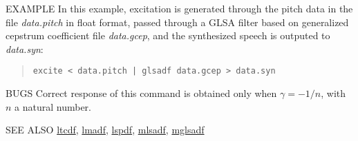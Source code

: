 \newpage
\begin{options}
\end{options}

\begin{qsection}{EXAMPLE}
In this example, excitation is generated through the pitch data
in the file {\em data.pitch} in float format, passed through a
GLSA filter based on generalized cepstrum coefficient file
{\em data.gcep}, and the synthesized speech is outputed to
{\em data.syn}:
\begin{quote}
 \verb!excite < data.pitch | glsadf data.gcep > data.syn!
\end{quote} 
\end{qsection}

\begin{qsection}{BUGS}
Correct response of this command is obtained only when
$\gamma = -1/n$, with $n$ a natural number.
\end{qsection}

\begin{qsection}{SEE ALSO}
\hyperlink{ltcdf}{ltcdf},
\hyperlink{lmadf}{lmadf},
\hyperlink{lspdf}{lspdf},
\hyperlink{mlsadf}{mlsadf},
\hyperlink{mglsadf}{mglsadf}
\end{qsection}
